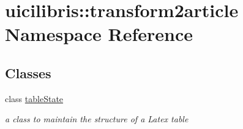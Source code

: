 \hypertarget{namespaceuicilibris_1_1transform2article}{\section{uicilibris\-:\-:transform2article \-Namespace \-Reference}
\label{namespaceuicilibris_1_1transform2article}
}
\subsection*{\-Classes}
\begin{DoxyCompactItemize}
\item 
class \hyperlink{classuicilibris_1_1transform2article_1_1tableState}{table\-State}
\begin{DoxyCompactList}\small\item\em a class to maintain the structure of a \-Latex table \end{DoxyCompactList}\end{DoxyCompactItemize}
